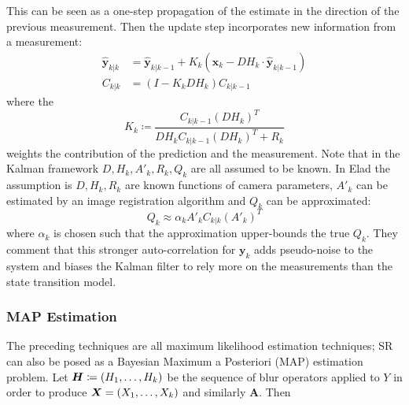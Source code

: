 This can be seen as a one-step propagation of the estimate in the direction of the previous measurement.
%
Then the update step incorporates new information from a measurement:
\begin{align}
    \hat{\bm{y}}_{k|k} & = \hat{\bm{y}}_{k|k-1} + K_k(\bm{x}_k - DH_k\cdot \hat{\bm{y}}_{k|k-1} ) \\
    C_{k|k}            & = (I - K_k DH_k)C_{k|k-1}
\end{align}
where the 
\begin{equation}
    K_k \coloneqq \frac{C_{k|k-1}(DH_k)^T}{DH_k C_{k|k-1} (DH_k)^T + R_k }
\end{equation}
weights the contribution of the prediction and the measurement.
%
Note that in the Kalman framework \(D, H_k, A'_k, R_k, Q_k\) are all assumed to be known.
%
In Elad \etal \cite{elad1999} the assumption is \(D, H_k, R_k\) are known functions of camera parameters, \(A'_k\) can be estimated by an image registration algorithm and \(Q_k\) can be approximated:
\begin{equation}
    Q_k \approx \alpha_k A'_k C_{k|k} (A'_k)^T
\end{equation}
where \(\alpha_k\) is chosen such that the approximation upper-bounds the true \(Q_k\).
%
They comment that this stronger auto-correlation for \(\bm{y}_k\) adds pseudo-noise to the system and biases the Kalman filter to rely more on the measurements than the state transition model.

\subsubsection{MAP Estimation}

The preceding techniques are all maximum likelihood estimation techniques; SR can also be posed as a Bayesian Maximum a Posteriori (MAP) estimation problem.
%
Let \(\bm{H} \coloneqq \left( H_1, \mathellipsis, H_k \right)\) be the sequence of blur operators applied to \(Y\) in order to produce \(\bm{X} = \left( X_1, \mathellipsis, X_k \right)\) and similarly \(\bm{A}\).
%
Then

